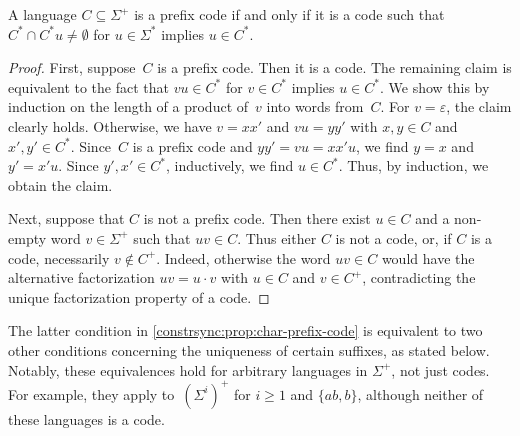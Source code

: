 \begin{proposition} \label{constrsync:prop:char-prefix-code}
	A language $C \subseteq \Sigma^+$ is a prefix code if and only if it is a code
	such that $C^* \cap C^*u \ne \emptyset$ for $u \in \Sigma^*$
	implies $u \in C^*$.
\end{proposition}
\begin{proof}
 First, suppose~$C$ is a prefix code.
 Then it is a code.
 The remaining claim is equivalent to the fact that $vu \in C^*$ for $v \in C^*$
 implies $u \in C^*$.
 We show this by induction on the length of a product of~$v$ into words from~$C$.
 For $v = \varepsilon$, the claim clearly holds.
 Otherwise, we have $v = xx'$ and $vu = yy'$ with $x,y \in C$
 and $x',y' \in C^*$.
 Since~$C$ is a prefix code and $yy' = vu = xx'u$,
 we find $y = x$ and $y' = x'u$.
 Since $y',x' \in C^*$, inductively, we find $u \in C^*$.
 Thus, by induction, we obtain the claim. 
 
 Next, suppose that $C$ is not a prefix code. Then there exist $u \in C$ and a non-empty word $v \in \Sigma^+$ such that $uv \in C$. Thus either $C$ is not a code, or, if $C$ is a code, necessarily $v \notin C^+$. Indeed, otherwise the word $uv \in C$ would have the alternative factorization
 $
 uv = u \cdot v
 $
with $u \in C$ and $v \in C^+$, contradicting the unique factorization property of a code.
\end{proof}

The latter condition in \cref{constrsync:prop:char-prefix-code} is equivalent to two other conditions concerning the uniqueness of certain suffixes, as stated below. Notably, these equivalences hold for arbitrary languages in $\Sigma^+$, 
not just codes. For example, they apply to~$(\Sigma^i)^+$ for $i \ge 1$ and $\{ab,b\}$, although neither of these languages is a code.

